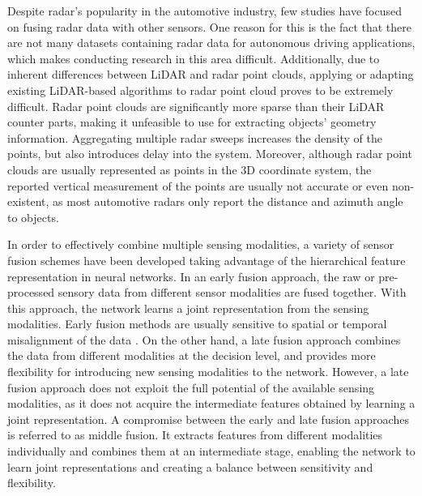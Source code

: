\documentclass[10pt,twocolumn,letterpaper]{article}
\begin{document}
   Despite radar's popularity in the automotive industry, few studies 
   have focused on fusing radar data with other sensors. 
   One reason for this is the fact that there are not many datasets containing radar
   data for autonomous driving applications, which makes conducting research in 
   this area difficult. Additionally, due to inherent differences between LiDAR 
   and radar point clouds, applying or adapting existing LiDAR-based algorithms 
   to radar point cloud proves to be extremely difficult.
   Radar point clouds are significantly more sparse than their LiDAR counter parts,
   making it unfeasible to use for extracting objects' geometry information. 
   Aggregating multiple radar sweeps increases the density of the points, but also
   introduces delay into the system.
   Moreover, although radar point clouds are usually represented as points
   in the 3D coordinate system, the reported vertical measurement of the points 
   are usually not accurate or even non-existent, as most automotive radars only 
   report the distance and azimuth angle to objects.
   
   In order to effectively combine multiple sensing modalities, a variety of sensor 
   fusion schemes have been developed \cite{fengDeepMultimodalObject2020} taking 
   advantage of the hierarchical feature representation in neural networks.
   In an early fusion approach, the raw or pre-processed sensory data
   from different sensor modalities are fused together. With this approach,
   the network learns a joint representation from the sensing modalities. 
   Early fusion methods are usually sensitive to spatial or temporal misalignment
   of the data \cite{fengDeepMultimodalObject2020}.
   On the other hand, a late fusion approach combines the data from 
   different modalities at the decision level, and provides more 
   flexibility for introducing new sensing modalities to the network. However,
   a late fusion approach does not exploit the full potential 
   of the available sensing modalities, as it does not acquire the intermediate
   features obtained by learning a joint representation.
   A compromise between the early and late fusion approaches is referred to as 
   middle fusion. It extracts features from different modalities individually and 
   combines them at an intermediate stage, enabling the network to learn 
   joint representations and creating a balance between sensitivity and flexibility.
   
\end{document}
